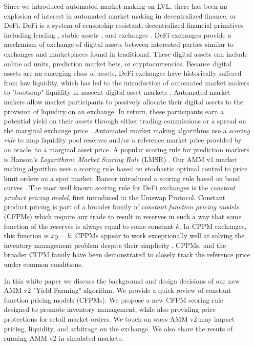 \documentclass{article}
\begin{document}
Since we introduced automated market making on LVL, there has been an explosion of interest in automated market making in decentralized finance, or DeFi. DeFi is a system of censorship-resistant, decentralized financial primitives including lending \cite{compound}, stable assets \cite{dai}, and exchanges \cite{uniswapv2}. DeFi exchanges provide a mechanism of exchange of digital assets between interested parties similar to exchanges and marketplaces found in traditional. These digital assets can include online ad units, prediction market bets, or cryptocurrencies. Because digital assets are an emerging class of assets, DeFi exchanges have historically suffered from low liquidity, which has led to the introduction of automated market makers to "bootsrap" liquidity in nascent digital asset markets \cite{practical}. Automated market makers allow market participants to passively allocate their digital assets to the provision of liquidity on an exchange. In return, these participants earn a potential yield on their assets through either trading commissions or a spread on the marginal exchange price \cite{yfintro}. Automated market making algorithms use a \emph{scoring rule} to map liquidity pool reserves and/or a reference market price provided by an oracle, to a marginal asset price. A popular scoring rule for prediction markets is Hanson's \emph{Logarithmic Market Scoring Rule} (LMSR) \cite{hanson}. Our AMM v1 market making algorithm uses a scoring rule based on stochastic optimal control to price limit orders on a spot market. Bancor introduced a scoring rule based on bond curves \cite{bancor}. The most well known scoring rule for DeFi exchanges is the \emph{constant product pricing model}, first introduced in the Uniswap Protocol. Constant product pricing is part of a broader family of \emph{constant function pricing models} (CFPMs) which require any trade to result in reserves in such a way that some function of the reserves is always equal to some constant $k$. In CPPM exchanges, this function is $xy = k$. CPPMs appear to work exceptionally well at solving the inventory management problem despite their simplicity \cite{stanford}. CPPMs, and the broader CFPM family have been demonstrated to closely track the reference price under common conditions.

In this white paper we discuss the background and design decisions of our new AMM v2 "Yield Farming" algorithm. We provide a quick review of constant function pricing models (CFPMs). We propose a new CFPM scoring rule designed to promote inventory management, while also providing price protections for retail market orders. We touch on ways AMM v2 may impact pricing, liquidity, and arbitrage on the exchange. We also share the resuts of running AMM v2 in simulated markets.
\end{document}
